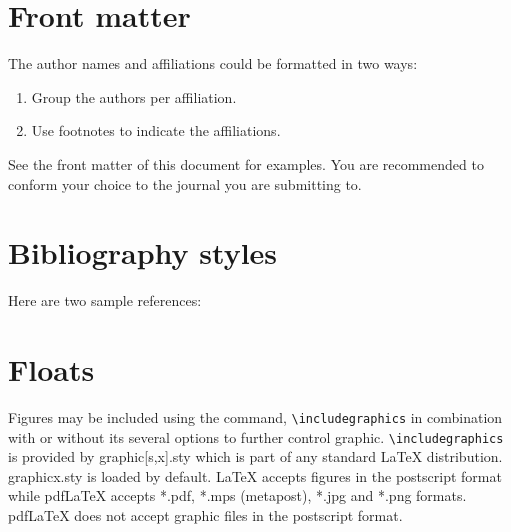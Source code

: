 \documentclass[a4paper,fleqn]{cas-dc}
\begin{document}
\section{Front matter}

The author names and affiliations could be formatted in two ways:
\begin{enumerate}[(1)]
\item Group the authors per affiliation.
\item Use footnotes to indicate the affiliations.
\end{enumerate}
See the front matter of this document for examples. 
You are recommended to conform your choice to the journal you 
are submitting to.

\section{Bibliography styles}

Here are two sample references:

\cite{Sydsaeter2016,NewmanGirvan2004}

\section{Floats}
{Figures} may be included using the command,\linebreak 
\verb+\includegraphics+ in
combination with or without its several options to further control
graphic. \verb+\includegraphics+ is provided by {graphic[s,x].sty}
which is part of any standard \LaTeX{} distribution.
{graphicx.sty} is loaded by default. \LaTeX{} accepts figures in
the postscript format while pdf\LaTeX{} accepts {*.pdf},
{*.mps} (metapost), {*.jpg} and {*.png} formats. 
pdf\LaTeX{} does not accept graphic files in the postscript format. 
\end{document}

